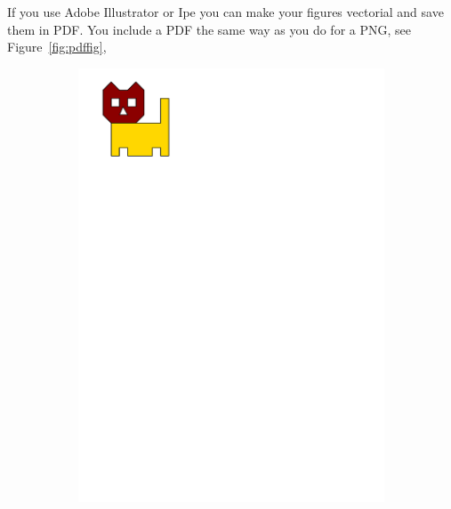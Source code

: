 If you use Adobe Illustrator or Ipe you can make your figures vectorial and save them in PDF\@.
You include a PDF the same way as you do for a PNG, see Figure~\ref{fig:pdffig},
\begin{figure}
  \centering
  \begin{subfigure}[b]{0.2\linewidth}
    \centering
    \includegraphics[page=1,width=\linewidth]{figs/tricat.pdf}
    \caption{}\label{fig:pdffig:1}
  \end{subfigure}%
  \qquad %
  \begin{subfigure}[b]{0.2\linewidth}
    \centering

\end{subfigure}
\end{figure}
